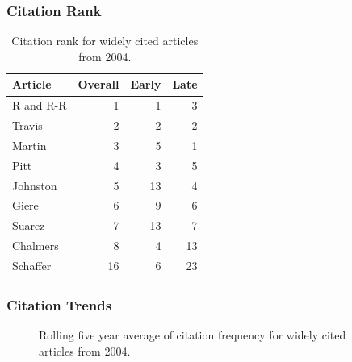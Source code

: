 \documentclass[
  10pt,
  letterpaper,
  DIV=11,
  numbers=noendperiod,
  twoside]{scrartcl}
\begin{document}
\subsubsection*{Citation Rank}\label{sec-rank-2004}

\begin{longtable}[]{@{}lrrr@{}}

\caption{\label{tbl-citation-rank-2004}Citation rank for widely cited
articles from 2004.}

\tabularnewline

\toprule\noalign{}
Article & Overall & Early & Late \\
\midrule\noalign{}
\endhead
\bottomrule\noalign{}
\endlastfoot
R and R-R & 1 & 1 & 3 \\
Travis & 2 & 2 & 2 \\
Martin & 3 & 5 & 1 \\
Pitt & 4 & 3 & 5 \\
Johnston & 5 & 13 & 4 \\
Giere & 6 & 9 & 6 \\
Suarez & 7 & 13 & 7 \\
Chalmers & 8 & 4 & 13 \\
Schaffer & 16 & 6 & 23 \\

\end{longtable}

\subsubsection*{Citation Trends}\label{sec-trends-2004}

\begin{figure}


\caption{\label{fig-citation-spaghetti-2004}Rolling five year average of
citation frequency for widely cited articles from 2004.}

\end{figure}%
\end{document}
